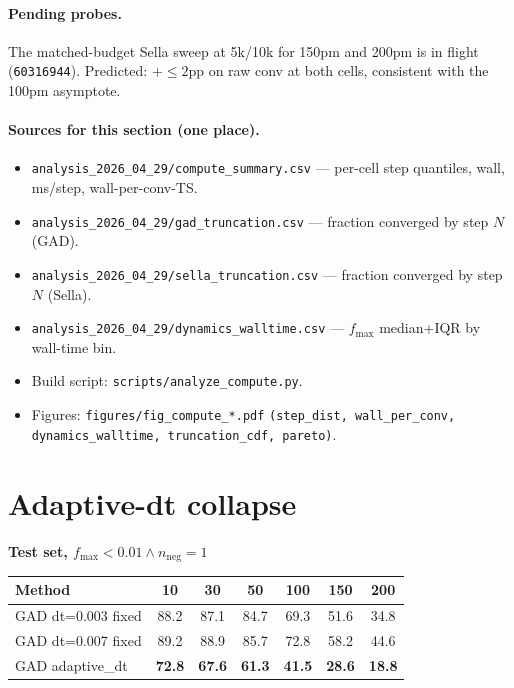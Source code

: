 \documentclass[11pt]{article}
\begin{document}
\paragraph{Pending probes.} The matched-budget Sella sweep at 5k/10k for
150pm and 200pm is in flight (\texttt{60316944}). Predicted: $+\le\!2$pp
on raw conv at both cells, consistent with the 100pm asymptote.

\paragraph{Sources for this section (one place).}
\begin{itemize}[leftmargin=1.5em, itemsep=0.1em]
\item \texttt{analysis\_2026\_04\_29/compute\_summary.csv} — per-cell
  step quantiles, wall, ms/step, wall-per-conv-TS.
\item \texttt{analysis\_2026\_04\_29/gad\_truncation.csv} — fraction
  converged by step $N$ (GAD).
\item \texttt{analysis\_2026\_04\_29/sella\_truncation.csv} — fraction
  converged by step $N$ (Sella).
\item \texttt{analysis\_2026\_04\_29/dynamics\_walltime.csv} — $f_{\max}$
  median+IQR by wall-time bin.
\item Build script: \texttt{scripts/analyze\_compute.py}.
\item Figures: \texttt{figures/fig\_compute\_*.pdf}
  \texttt{(step\_dist, wall\_per\_conv, dynamics\_walltime, truncation\_cdf, pareto)}.
\end{itemize}

\newpage
\section{Adaptive-dt collapse}
\label{sec:adapt}

\begin{center}
\textbf{Test set, $f_{\max}{<}0.01 \wedge n_{\text{neg}}{=}1$} \\[0.3em]
\begin{tabular}{l|cccccc}
\toprule
Method & 10 & 30 & 50 & 100 & 150 & 200 \\
\midrule
GAD dt=0.003 fixed     & 88.2 & 87.1 & 84.7 & 69.3 & 51.6 & 34.8 \\
GAD dt=0.007 fixed     & 89.2 & 88.9 & 85.7 & 72.8 & 58.2 & 44.6 \\
GAD adaptive\_dt       & \textbf{72.8} & \textbf{67.6} & \textbf{61.3} & \textbf{41.5} & \textbf{28.6} & \textbf{18.8} \\
\bottomrule
\end{tabular}
\end{center}
\end{document}
